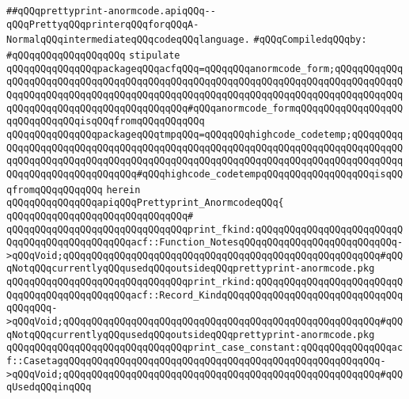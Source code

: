 \label{src/lib/compiler/back/top/anormcode/prettyprint-anormcode.api}
\verb|##qQQqprettyprint-anormcode.apiqQQq--qQQqPrettyqQQqprinterqQQqforqQQqA-NormalqQQqintermediateqQQqcodeqQQqlanguage.|\newline
\newline
\verb|#qQQqCompiledqQQqby:|\newline
\verb|#qQQqqQQqqQQqqQQqqQQq|\newline
\newline
\newline
\verb|stipulate|\newline
\verb|qQQqqQQqqQQqqQQqpackageqQQqacfqQQq=qQQqqQQqanormcode_form;qQQqqQQqqQQqqQQqqQQqqQQqqQQqqQQqqQQqqQQqqQQqqQQqqQQqqQQqqQQqqQQqqQQqqQQqqQQqqQQqqQQqqQQqqQQqqQQqqQQqqQQqqQQqqQQqqQQqqQQqqQQqqQQqqQQqqQQqqQQqqQQqqQQqqQQqqQQqqQQqqQQqqQQqqQQqqQQqqQQqqQQq#qQQqanormcode_formqQQqqQQqqQQqqQQqqQQqqQQqqQQqqQQqisqQQqfromqQQqqQQqqQQq|\newline
\verb|qQQqqQQqqQQqqQQqpackageqQQqtmpqQQq=qQQqqQQqhighcode_codetemp;qQQqqQQqqQQqqQQqqQQqqQQqqQQqqQQqqQQqqQQqqQQqqQQqqQQqqQQqqQQqqQQqqQQqqQQqqQQqqQQqqQQqqQQqqQQqqQQqqQQqqQQqqQQqqQQqqQQqqQQqqQQqqQQqqQQqqQQqqQQqqQQqqQQqqQQqqQQqqQQqqQQqqQQqqQQq#qQQqhighcode_codetempqQQqqQQqqQQqqQQqqQQqisqQQqfromqQQqqQQqqQQq|\newline
\verb|herein|\newline
\verb|qQQqqQQqqQQqqQQqapiqQQqPrettyprint_AnormcodeqQQq{|\newline
\verb|qQQqqQQqqQQqqQQqqQQqqQQqqQQqqQQq#|\newline
\verb|qQQqqQQqqQQqqQQqqQQqqQQqqQQqqQQqprint_fkind:qQQqqQQqqQQqqQQqqQQqqQQqqQQqqQQqqQQqqQQqqQQqqQQqacf::Function_NotesqQQqqQQqqQQqqQQqqQQqqQQqqQQq->qQQqVoid;qQQqqQQqqQQqqQQqqQQqqQQqqQQqqQQqqQQqqQQqqQQqqQQqqQQqqQQq#qQQqNotqQQqcurrentlyqQQqusedqQQqoutsideqQQqprettyprint-anormcode.pkg|\newline
\verb|qQQqqQQqqQQqqQQqqQQqqQQqqQQqqQQqprint_rkind:qQQqqQQqqQQqqQQqqQQqqQQqqQQqqQQqqQQqqQQqqQQqqQQqacf::Record_KindqQQqqQQqqQQqqQQqqQQqqQQqqQQqqQQqqQQqqQQq->qQQqVoid;qQQqqQQqqQQqqQQqqQQqqQQqqQQqqQQqqQQqqQQqqQQqqQQqqQQqqQQq#qQQqNotqQQqcurrentlyqQQqusedqQQqoutsideqQQqprettyprint-anormcode.pkg|\newline
\verb|qQQqqQQqqQQqqQQqqQQqqQQqqQQqqQQqprint_case_constant:qQQqqQQqqQQqqQQqacf::CasetagqQQqqQQqqQQqqQQqqQQqqQQqqQQqqQQqqQQqqQQqqQQqqQQqqQQqqQQq->qQQqVoid;qQQqqQQqqQQqqQQqqQQqqQQqqQQqqQQqqQQqqQQqqQQqqQQqqQQqqQQq#qQQqUsedqQQqinqQQq|\newline
